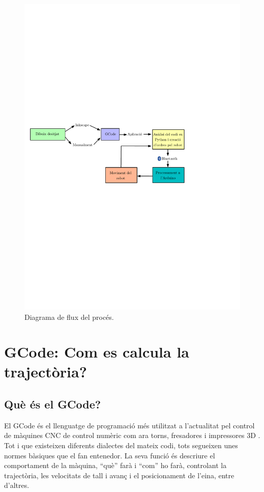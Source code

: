 \begin{figure}[H]
	\centering
	\includegraphics{figuretry}
	\caption{Diagrama de flux del procés.}
	\label{fig:diagflux}
\end{figure}




\section{GCode: Com es calcula la trajectòria?}

\subsection{Què és el GCode?}
El GCode és el llenguatge de programació més utilitzat a l'actualitat pel control de màquines CNC de control numèric com ara torns, fresadores i impressores 3D \cite{petersmid2008} . Tot i que existeixen diferents dialectes del mateix codi, tots segueixen unes normes bàsiques que el fan entenedor. La seva funció és descriure el comportament de la màquina, “què” farà i “com” ho farà, controlant la trajectòria, les velocitats de tall i avanç i el posicionament de l'eina, entre d'altres.

